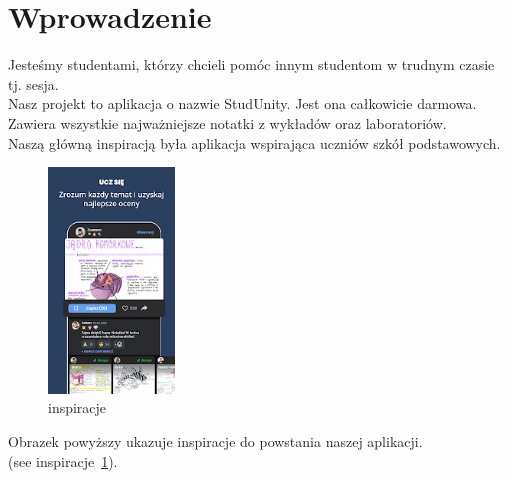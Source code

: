 \section{Wprowadzenie}
\label{sec:Wprowadzenie}

    Jesteśmy studentami, którzy chcieli pomóc innym studentom w trudnym czasie tj. sesja. \\ 
    Nasz projekt to aplikacja o nazwie StudUnity. Jest ona całkowicie darmowa. Zawiera wszystkie najważniejsze notatki z wykładów oraz laboratoriów. \\ Naszą główną inspiracją była aplikacja wspirająca uczniów szkół podstawowych.
    
\begin{figure}[htbp]
    \centering
    \includegraphics[width=0.3\textwidth]{pictures/inspriracje.jpg}
    \caption{inspiracje}
    \label{fig:inspiracje}
\end{figure}

\noindent Obrazek powyższy ukazuje inspiracje do powstania naszej aplikacji.\\
(see inspiracje~\ref{fig:inspiracje}).

